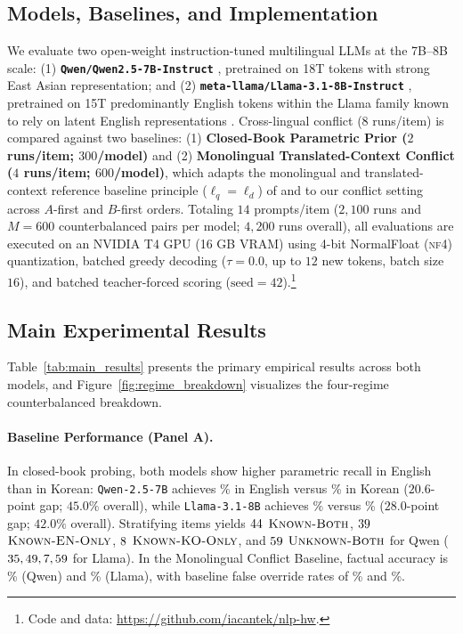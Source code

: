 \subsection{Models, Baselines, and Implementation}
\label{subsec:models_baselines}\label{subsec:implementation}

We evaluate two open-weight instruction-tuned multilingual LLMs at the 7B--8B scale: (1) \textbf{\texttt{Qwen/Qwen2.5-7B-Instruct}} \citep{yang2024qwen25}, pretrained on 18T tokens with strong East Asian representation; and (2) \textbf{\texttt{meta-llama/Llama-3.1-8B-Instruct}} \citep{grattafiori2024llama3}, pretrained on 15T predominantly English tokens within the Llama family known to rely on latent English representations \citep{wendler2024llamas}. Cross-lingual conflict ($8$ runs/item) is compared against two baselines: (1) \textbf{Closed-Book Parametric Prior ($2$ runs/item; $300$/model)} and (2) \textbf{Monolingual Translated-Context Conflict ($4$ runs/item; $600$/model)}, which adapts the monolingual and translated-context reference baseline principle ($\ell_q = \ell_d$) of \citet{park2025investigating} and \citet{ki2025linguistic} to our conflict setting across $A$-first and $B$-first orders. Totaling $14$ prompts/item ($2{,}100$ runs and $M{=}600$ counterbalanced pairs per model; $4{,}200$ runs overall), all evaluations are executed on an NVIDIA T4 GPU (16 GB VRAM) using 4-bit NormalFloat (\textsc{nf4}) quantization, batched greedy decoding ($\tau{=}0.0$, up to $12$ new tokens, batch size $16$), and batched teacher-forced scoring ($\text{seed}{=}42$).\footnote{Code and data: \url{https://github.com/iacantek/nlp-hw}.}

\subsection{Main Experimental Results}
\label{subsec:main_results}

Table~\ref{tab:main_results} presents the primary empirical results across both models, and Figure~\ref{fig:regime_breakdown} visualizes the four-regime counterbalanced breakdown.

\paragraph{Baseline Performance (Panel A).}
In closed-book probing, both models show higher parametric recall in English than in Korean: \texttt{Qwen-2.5-7B} achieves \qwenCBAccEN\% in English versus \qwenCBAccKO\% in Korean ($20.6$-point gap; $45.0\%$ overall), while \texttt{Llama-3.1-8B} achieves \llamaCBAccEN\% versus \llamaCBAccKO\% ($28.0$-point gap; $42.0\%$ overall). Stratifying items yields $44$ $\textsc{Known-Both}$, $39$ $\textsc{Known-EN-Only}$, $8$ $\textsc{Known-KO-Only}$, and $59$ $\textsc{Unknown-Both}$ for Qwen ($35, 49, 7, 59$ for Llama). In the Monolingual Conflict Baseline, factual accuracy is \qwenMonoAccAll\% (Qwen) and \llamaMonoAccAll\% (Llama), with baseline false override rates of \qwenMonoOverrideAll\% and \llamaMonoOverrideAll\%.

